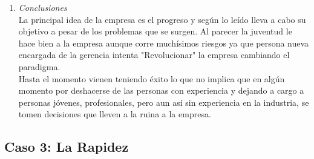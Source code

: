 \documentclass[a4paper,10pt]{article}
\begin{document}
\begin{enumerate}
			\item \textit{Conclusiones}\\
			La principal idea de la empresa es el progreso y seg\'un lo le\'ido lleva a cabo su objetivo a pesar de los problemas que se surgen. Al parecer la juventud le hace bien a la empresa aunque corre muchísimos riesgos ya que persona nueva encargada de la gerencia intenta "Revolucionar" la empresa cambiando el paradigma.\\
			Hasta el momento vienen teniendo éxito lo que no implica que en alg\'un momento por deshacerse de las personas con experiencia y dejando a cargo a personas jóvenes, profesionales, pero aun así sin experiencia en la industria, se tomen decisiones que lleven a la ruina a la empresa.\\
			
			\end{enumerate}
		
	\subsection{Caso 3: La Rapidez}
\end{document}
